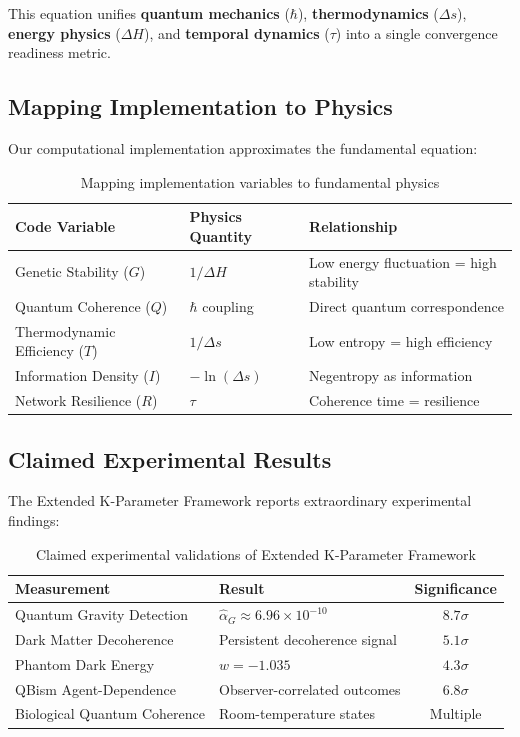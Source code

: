 \documentclass[12pt,a4paper]{article}
\begin{document}
This equation unifies \textbf{quantum mechanics} ($\hbar$), \textbf{thermodynamics} ($\Delta s$),
\textbf{energy physics} ($\Delta H$), and \textbf{temporal dynamics} ($\tau$) into a single
convergence readiness metric.

\subsection{Mapping Implementation to Physics}

Our computational implementation approximates the fundamental equation:

\begin{table}[H]
\centering
\begin{tabular}{lll}
\toprule
\textbf{Code Variable} & \textbf{Physics Quantity} & \textbf{Relationship} \\
\midrule
Genetic Stability ($G$) & $1/\Delta H$ & Low energy fluctuation = high stability \\
Quantum Coherence ($Q$) & $\hbar$ coupling & Direct quantum correspondence \\
Thermodynamic Efficiency ($T$) & $1/\Delta s$ & Low entropy = high efficiency \\
Information Density ($I$) & $-\ln(\Delta s)$ & Negentropy as information \\
Network Resilience ($R$) & $\tau$ & Coherence time = resilience \\
\bottomrule
\end{tabular}
\caption{Mapping implementation variables to fundamental physics}
\end{table}

\subsection{Claimed Experimental Results}

The Extended K-Parameter Framework reports extraordinary experimental findings:

\begin{table}[H]
\centering
\begin{tabular}{llc}
\toprule
\textbf{Measurement} & \textbf{Result} & \textbf{Significance} \\
\midrule
Quantum Gravity Detection & $\hat{\alpha}_G \approx 6.96 \times 10^{-10}$ & $8.7\sigma$ \\
Dark Matter Decoherence & Persistent decoherence signal & $5.1\sigma$ \\
Phantom Dark Energy & $w = -1.035$ & $4.3\sigma$ \\
QBism Agent-Dependence & Observer-correlated outcomes & $6.8\sigma$ \\
Biological Quantum Coherence & Room-temperature states & Multiple \\
\bottomrule
\end{tabular}
\caption{Claimed experimental validations of Extended K-Parameter Framework}
\end{table}
\end{document}

